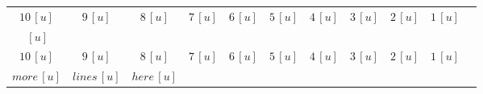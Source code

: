\documentclass{article}
\begin{document}
\begin{tabular}{ccccccccccc}
$10\,[u]$&$9\,[u]$&$8\,[u]$&$7\,[u]$&$6\,[u]$&$5\,[u]$&$4\,[u]$&$3\,[u]$&$2\,[u]$&$1\,[u]$&\\
$\,[u]$&\\
$10\,[u]$&$9\,[u]$&$8\,[u]$&$7\,[u]$&$6\,[u]$&$5\,[u]$&$4\,[u]$&$3\,[u]$&$2\,[u]$&$1\,[u]$&\\
$more\,[u]$&$lines\,[u]$&$here\,[u]$&\\
\end{tabular}
\end{document}
